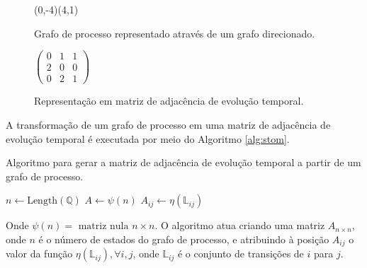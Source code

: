 \documentclass[12pt,a4paper]{article}
\let\vState=\origState
\begin{document}
\begin{figure}[ht]
\begin{minipage}[b]{0.5\linewidth}
\begin{center}
\begin{VCPicture}{(0,-4)(4,1)}
\vState[1]{(0,0)}{A} \vState[2]{(4,0)}{B}
\vState[3]{(2,-2)}{C}
  
 
\end{VCPicture}
\caption{Grafo de processo representado através de um grafo direcionado.}
\label{fig:semigraph}
\end{center}
\end{minipage}
\hspace{0.5cm}
\begin{minipage}[b]{0.5\linewidth}
\begin{center}
\begin{math}
\begin{pmatrix}
0 & 1 & 1 \\
2 & 0 & 0 \\
0 & 2 & 1
\end{pmatrix}
\end{math}
\caption{Representação em matriz de adjacência de evolução temporal.}
\label{fig:iadjm}
\end{center}
\end{minipage}
\end{figure}

A transformação de um grafo de processo em uma matriz de adjacência
de evolução temporal é executada por meio do Algoritmo \ref{alg:stom}.

\begin{algorithm}
\caption{Algoritmo para gerar a matriz de adjacência de evolução temporal a partir
de um grafo de processo.}
\label{alg:stom}
\begin{algorithmic}
\STATE $n \leftarrow \mbox{Length}(\mathbb{Q})$ 
\STATE $A \leftarrow \psi(n)$
        \STATE $A_{ij} \leftarrow \eta(\mathbb{\mathbb{L}}_{ij})$
    \ENDIF
\ENDFOR
\end{algorithmic}
\end{algorithm}

Onde $\psi(n) = \mbox{ matriz nula } n \times n$.
O algoritmo atua criando uma matriz $A_{n \times n}$, onde $n$ é o número
de estados do grafo de processo, e atribuindo à posição $A_{ij}$ o valor
da função $\eta(\mathbb{L}_{ij}),\forall i,j$, onde $\mathbb{L}_{ij}$
é o conjunto de transições de $i$ para $j$.
\end{document}

